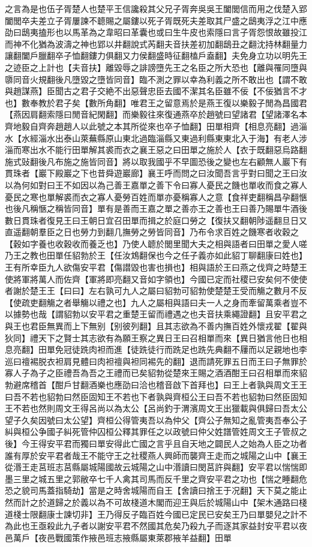 之言為是也伍子胥楚人也楚平王信讒殺其父兄子胥奔吳吳王闔閭信而用之伐楚入郢闔閭卒夫差立子胥屢諫不聼賜之屬鏤以死子胥既死夫差取其尸盛之鴟夷浮之江中應劭曰鴟夷搕形也以馬革為之韋昭曰革囊也或曰生牛皮也索隱曰言子胥怨恨故雖投江而神不化猶為波濤之神也郢以井翻說式芮翻夫音扶差初加翻鴟丑之翻沈持林翻量力讓翻闔戶臘翻卒子恤翻鏤力俱翻又力侯翻盛時征翻榼戶盍翻】夫免身立功以明先王之迹臣之上計也【夫音扶】離毀辱之誹謗墮先王之名臣之所大恐也【離與罹同墮與隳同音火規翻後凡墮毀之墮皆同音】臨不測之罪以幸為利義之所不敢出也【謂不敢與趙謀燕】臣聞古之君子交絶不出惡聲忠臣去國不潔其名臣雖不佞【不佞猶言不才也】數奉教於君子矣【數所角翻】唯君王之留意焉於是燕王復以樂毅子閒為昌國君【燕因肩翻索隱曰閒音紀閑翻】而樂毅往來復通燕卒於趙號曰望諸君【望諸澤名本齊地毅自齊奔趙趙人以此號之本其所從來也卒子恤翻】田單相齊【相息亮翻】過淄水【水經淄水出泰山萊蕪縣原山東北過臨淄縣又東過利縣東東北入于海】有老人涉淄而寒出水不能行田單解其裘而衣之襄王惡之曰田單之施於人【衣于既翻惡烏路翻施式䜴翻後凡布施之施皆同音】將以取我國乎不早圖恐後之變也左右顧無人巖下有貫珠者【巖下殿巖之下也昔舜遊巖廊】襄王呼而問之曰汝聞吾言乎對曰聞之王曰汝以為何如對曰王不如因以為己善王嘉單之善下令曰寡人憂民之饑也單收而食之寡人憂民之寒也單解裘而衣之寡人憂勞百姓而單亦憂稱寡人之意【食祥吏翻稱昌孕翻愜也後凡稱愜之稱皆同音】單有是善而王嘉之單之善亦王之善也王曰善乃賜單牛酒後數日貫珠者復見王曰王朝日宜召田單而揖之於庭口勞之【復扶又翻朝陟遥翻旦日又直遥翻朝羣臣之日也勞力到翻几撫勞之勞皆同音】乃布令求百姓之饑寒者收穀之【穀如字養也收穀收而養乏也】乃使人聼於閭里聞大夫之相與語者曰田單之愛人嗟乃王之教也田單任貂勃於王【任汝鴆翻保也今之任子義亦如此貂丁聊翻康曰姓也】王有所幸臣九人欲傷安平君【傷譛毀也害也損也】相與語於王曰燕之伐齊之時楚王使將軍將萬人而佐齊【軍將即亮翻又音如字領也】今國已定而社稷已安矣何不使使者謝於楚王王【曰曰】左右孰可九人之屬曰貂勃可貂勃使楚楚王受而觴之數月不反【使疏吏翻觴之者舉觴以禮之也】九人之屬相與語曰夫一人之身而牽留萬乘者豈不以據勢也哉【謂貂勃以安平君之重楚王留而禮遇之也夫音扶乘繩證翻】且安平君之與王也君臣無異而上下無别【别彼列翻】且其志欲為不善内撫百姓外懷戎翟【翟與狄同】禮天下之賢士其志欲有為願王察之異日王曰召相單而來【異日猶言他日也相息亮翻】田單免冠徒跣肉袒而進【徒跣徒行而跣足也跣先典翻不屨而以足親地也李巡曰䄠裼脱衣袒肩見體曰肉袒䄠與袒同裼先的翻】退而請死罪五日而王曰子無罪於寡人子為子之臣禮吾為吾之王禮而已矣貂勃從楚來王賜之酒酒酣王曰召相單而來貂勃避席稽首【酣戶甘翻酒樂也應劭曰洽也稽音啟下首拜也】曰王上者孰與周文王王曰吾不若也貂勃曰然臣固知王不若也下者孰與齊桓公王曰吾不若也貂勃曰然臣固知王不若也然則周文王得呂尚以為太公【呂尚釣于渭濱周文王出獵載與俱歸曰吾太公望子久矣因號曰太公望】齊桓公得管夷吾以為仲父【齊公子無知之亂管夷吾奉公子糾與桓公争國子糾死管仲囚桓公釋其罪任之以政號曰仲父姓譜管姓周文王子管叔之後】今王得安平君而獨曰單安得此亡國之言乎且自天地之闢民人之始為人臣之功者誰有厚於安平君者哉王不能守王之社稷燕人興師而襲齊王走而之城陽之山中【襄王從湣王走莒班志莒縣屬城陽國故云城陽之山中湣讀曰閔莒許與翻】安平君以惴惴即墨三里之城五里之郭敝卒七千人禽其司馬而反千里之齊安平君之功也【惴之睡翻危恐之貌司馬蓋指騎劫】當是之時舍城陽而自王【舍讀曰捨王于况翻】天下莫之能止然而計之於道歸之於義以為不可故棧道木閣而迎王與后於城陽山中【架木通路曰棧道棧士限翻康士諫切非】王乃得反子臨百姓今國已定民已安矣王乃曰單嬰兒之計不為此也王亟殺此九子者以謝安平君不然國其危矣乃殺九子而逐其家益封安平君以夜邑萬戶【夜邑戰國策作掖邑班志掖縣屬東萊郡掖羊益翻】田單